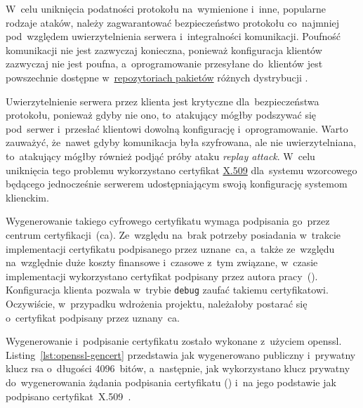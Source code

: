 \documentclass[thesis]{subfiles}
\begin{document}
W~celu uniknięcia podatności protokołu na~wymienione i~inne, popularne rodzaje ataków, należy zagwarantować bezpieczeństwo protokołu co~najmniej pod~względem uwierzytelnienia serwera i~integralności komunikacji. Poufność komunikacji nie jest zazwyczaj konieczna, ponieważ konfiguracja klientów zazwyczaj nie jest poufna, a~oprogramowanie przesyłane do~klientów jest powszechnie dostępne w~\href{https://wiki.archlinux.org/index.php/official_repositories}{repozytoriach pakietów} różnych dystrybucji . %

Uwierzytelnienie serwera przez klienta jest krytyczne dla~bezpieczeństwa protokołu, ponieważ gdyby nie ono, to~atakujący mógłby podszywać się pod~serwer i~przesłać klientowi dowolną konfigurację i~oprogramowanie. Warto zauważyć, że~nawet gdyby komunikacja była szyfrowana, ale nie uwierzytelniana, to~atakujący mógłby również podjąć próby ataku \emph{replay attack}. W~celu uniknięcia tego problemu wykorzystano certyfikat \href{https://en.wikipedia.org/wiki/X.509}{X.509} dla~systemu wzorcowego będącego jednocześnie serwerem udostępniającym swoją konfigurację systemom klienckim.

Wygenerowanie takiego cyfrowego certyfikatu wymaga podpisania go~przez centrum certyfikacji~(\gls{ca}). Ze~względu na~brak potrzeby posiadania w~trakcie implementacji certyfikatu podpisanego przez uznane~\gls{ca}, a~także ze~względu na~względnie duże koszty finansowe i~czasowe z~tym związane, w~czasie implementacji wykorzystano certyfikat podpisany przez autora pracy~(). Konfiguracja klienta pozwala w~trybie \texttt{debug} zaufać takiemu certyfikatowi. Oczywiście, w~przypadku wdrożenia projektu, należałoby postarać się o~certyfikat podpisany przez uznany~\gls{ca}.

Wygenerowanie i~podpisanie certyfikatu zostało wykonane z~użyciem \gls{openssl}. Listing~\ref{lst:openssl-gencert} przedstawia jak wygenerowano publiczny i~prywatny klucz \gls{rsa} o~długości 4096~bitów, a~następnie, jak wykorzystano klucz prywatny do~wygenerowania żądania podpisania certyfikatu () i~na jego podstawie jak podpisano certyfikat~X.509~\cite{openssl-cookbook}.
\end{document}
